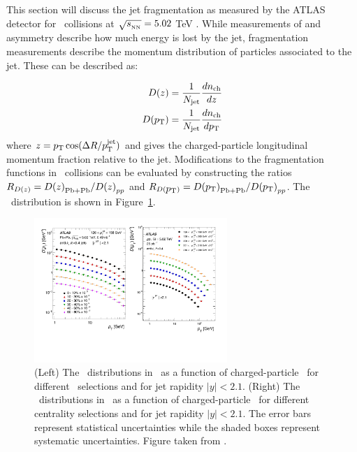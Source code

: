 
This section will discuss the jet fragmentation as measured by the ATLAS detector for \pbpb\ collisions at $\mbox{$\sqrt{s_{_\text{NN}}}$} = 5.02$ TeV \cite{PhysRevC.98.024908}.
While measurements of \RAA \cite{20151, Aad:2014bxa, Khachatryan:2016jfl} and asymmetry \cite{Aaboud:2017eww, Chatrchyan:2011sx, PhysRevLett.119.062301} describe how much energy is lost by the jet, fragmentation measurements describe the momentum distribution of particles associated to the jet.
These can be described as:

\begin{align}
\mbox{$D(z)$} = \frac{1}{\mbox{$N_{\mathrm{jet}}$}} \frac{d\mbox{$n_{\mathrm{ch}}$}}{dz} \\
\mbox{$D(\mbox{$p_{\mathrm{T}}$})$} = \frac{1}{\mbox{$N_{\mathrm{jet}}$}} \frac{d\mbox{$n_{\mathrm{ch}}$}}{d\mbox{$p_{\mathrm{T}}$}}
\end{align}
where $z = \mbox{$p_{\mathrm{T}}$} \cos(\Delta R / \mbox{$p_{\mathrm{T}}^{\mathrm{jet}}$})$ and gives the charged-particle longitudinal momentum fraction relative to the jet.
Modifications to the fragmentation functions in \pbpb\ collisions can be evaluated by constructing the ratios $\mbox{$R_{D(z)}$} = \mbox{$D(z)$}_{\rm Pb+Pb} / \mbox{$D(z)$}_{pp}$ and $\mbox{$R_{D(\mbox{$p_{\mathrm{T}}$})}$} = \mbox{$D(\mbox{$p_{\mathrm{T}}$})$}_{\rm Pb+Pb} / \mbox{$D(\mbox{$p_{\mathrm{T}}$})$}_{pp}$.
The \Dpt\ distribution is shown in Figure~\ref{fig:jetff_dpt}.

\begin{figure}[htbp]
\begin{center}
\includegraphics[width=0.65\textwidth]{figures/jetMeasurements/jetff_dpt}
\caption{(Left) The \Dpt\ distributions in \pp\ as a function of charged-particle \pt\ for different \ptjet\ selections and for jet rapidity $|y| < 2.1$.
(Right) The \Dpt\ distributions in \pbpb\ as a function of charged-particle \pt\ for different centrality selections and for jet rapidity $|y| < 2.1$.
The error bars represent statistical uncertainties while the shaded boxes represent systematic uncertainties.
Figure taken from \cite{PhysRevC.98.024908}.}
\label{fig:jetff_dpt}
\end{center}
\end{figure}


